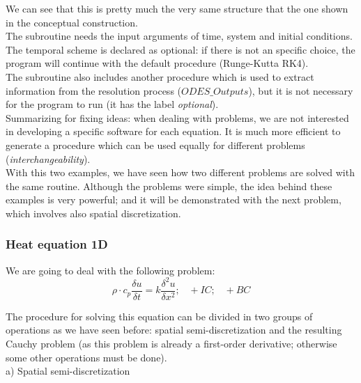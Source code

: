 \vspace{0.5cm}

We can see that this is pretty much the very same structure that the one shown
in the conceptual construction.\\

The subroutine needs the input arguments of time, system and initial conditions. The temporal
scheme is declared as optional: if there is not an specific choice, the program
will continue with the default procedure (Runge-Kutta RK4).
\\

The subroutine also includes another procedure which is used to extract
information from the resolution process (${ODES\_ Outputs}$), but it is
not necessary for the program to run (it has the label \textit{optional}).\\

Summarizing for fixing ideas: when dealing with problems, we are not
interested in developing a specific software for each equation. It is much
more efficient to generate a procedure which can be used equally for different
problems (\textit{interchangeability}).\\

With this two examples, we have seen how two different problems are solved with 
the same routine. Although the problems
were simple, the idea behind these examples is very powerful; and it will be
demonstrated with the next problem, which involves also spatial
discretization.\\

\subsubsection*{Heat equation 1D}

We are going to deal with the following problem:
$$
\rho \cdot c_p \frac{\delta u}{\delta t}= k \frac{\delta^2 u}{\delta x^2};\;\;\;
+IC; \;\;\; +BC
$$

The procedure for solving this equation can be divided in two groups of
operations as we have seen before: spatial semi-discretization and the
resulting Cauchy problem (as this problem is already a first-order derivative;
otherwise some other operations must be done).\\

\newpage
a) Spatial semi-discretization\\

